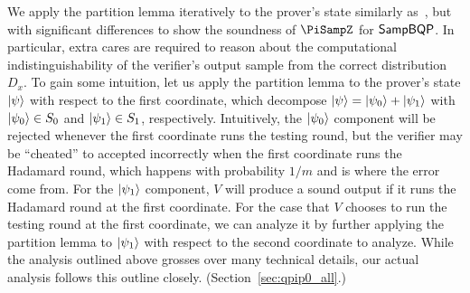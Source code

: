 We apply the partition lemma iteratively to the prover's state  similarly as~\cite{arXiv:ChiaChungYam19}, but with significant differences to show the soundness of $\PiSampZ$ for $\operatorname{\mathsf{SampBQP}}$. In particular, extra cares are required to reason about the computational indistinguishability of the verifier's output sample from the correct distribution $D_x$. To gain some intuition, let us apply the partition lemma to the prover's state $\ket{\psi}$ with respect to the first coordinate, which decompose $\ket{\psi} = \ket{\psi_0} + \ket{\psi_1}$ with $\ket{\psi_0} \in S_0$ and  $\ket{\psi_1} \in S_1$, respectively. Intuitively, the $\ket{\psi_0}$ component will be rejected whenever the first coordinate runs the testing round, but the verifier may be ``cheated'' to accepted incorrectly when the first coordinate runs the Hadamard round, which happens with probability $1/m$ and is where the error come from. For the $\ket{\psi_1}$ component, $V$ will produce a sound output if it runs the Hadamard round at the first coordinate. For the case that $V$ chooses to run the testing round at the first coordinate, we can analyze it by further applying the partition lemma to $\ket{\psi_1}$ with respect to the second coordinate to analyze. 
%
While the analysis outlined above grosses over many technical details, our actual analysis follows this outline closely. 
(Section~\ref{sec:qpip0_all}.)






